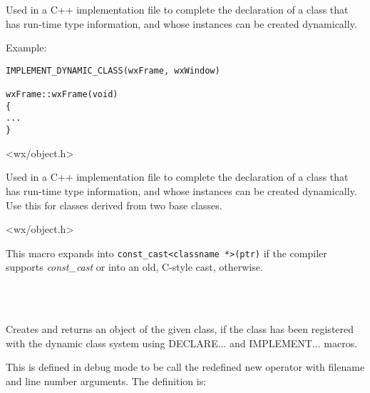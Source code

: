 
Used in a C++ implementation file to complete the declaration of
a class that has run-time type information, and whose instances
can be created dynamically.

Example:

\begin{verbatim}
IMPLEMENT_DYNAMIC_CLASS(wxFrame, wxWindow)

wxFrame::wxFrame(void)
{
...
}
\end{verbatim}


<wx/object.h>


\label{implementdynamicclass2}


Used in a C++ implementation file to complete the declaration of
a class that has run-time type information, and whose instances
can be created dynamically. Use this for classes derived from two
base classes.


<wx/object.h>


\label{wxconstcast}


This macro expands into {\tt const\_cast<classname *>(ptr)} if the compiler
supports {\it const\_cast} or into an old, C-style cast, otherwise.


\\
\\


\label{wxcreatedynamicobject}


Creates and returns an object of the given class, if the class has been
registered with the dynamic class system using DECLARE... and IMPLEMENT... macros.


\label{debugnew}


This is defined in debug mode to be call the redefined new operator
with filename and line number arguments. The definition is:

